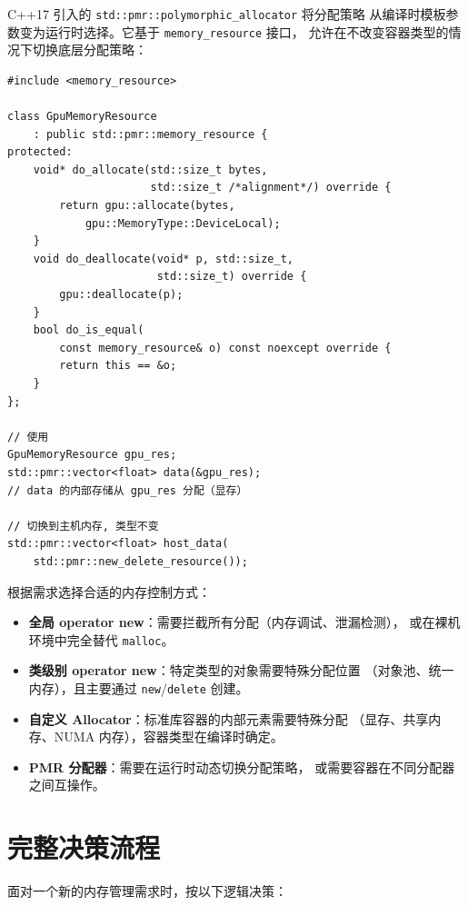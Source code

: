 \documentclass[12pt,a4paper,fontset=fandol]{ctexbook}
\newcommand{\cpp}[1]{C++#1}
\begin{document}
\cpp{17} 引入的 \texttt{std::pmr::polymorphic\_allocator} 将分配策略
从编译时模板参数变为运行时选择。它基于 \texttt{memory\_resource} 接口，
允许在不改变容器类型的情况下切换底层分配策略：

\begin{lstlisting}
#include <memory_resource>

class GpuMemoryResource
    : public std::pmr::memory_resource {
protected:
    void* do_allocate(std::size_t bytes,
                      std::size_t /*alignment*/) override {
        return gpu::allocate(bytes,
            gpu::MemoryType::DeviceLocal);
    }
    void do_deallocate(void* p, std::size_t,
                       std::size_t) override {
        gpu::deallocate(p);
    }
    bool do_is_equal(
        const memory_resource& o) const noexcept override {
        return this == &o;
    }
};

// 使用
GpuMemoryResource gpu_res;
std::pmr::vector<float> data(&gpu_res);
// data 的内部存储从 gpu_res 分配（显存）

// 切换到主机内存, 类型不变
std::pmr::vector<float> host_data(
    std::pmr::new_delete_resource());
\end{lstlisting}

\begin{bestpractice}[title=选择正确的机制]
根据需求选择合适的内存控制方式：
\begin{itemize}
    \item \textbf{全局 operator new}：需要拦截所有分配（内存调试、泄漏检测），
          或在裸机环境中完全替代 \texttt{malloc}。
    \item \textbf{类级别 operator new}：特定类型的对象需要特殊分配位置
          （对象池、统一内存），且主要通过 \texttt{new}/\allowbreak{}\texttt{delete} 创建。
    \item \textbf{自定义 Allocator}：标准库容器的内部元素需要特殊分配
          （显存、共享内存、NUMA 内存），容器类型在编译时确定。
    \item \textbf{PMR 分配器}：需要在运行时动态切换分配策略，
          或需要容器在不同分配器之间互操作。
\end{itemize}
\end{bestpractice}

\section{完整决策流程}

面对一个新的内存管理需求时，按以下逻辑决策：
\end{document}
